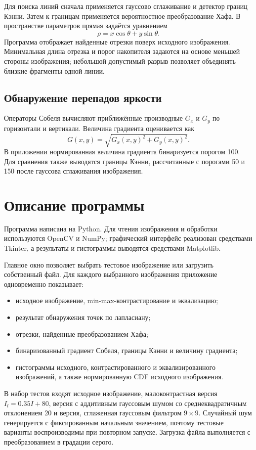 \documentclass[12pt,a4paper]{article}
\begin{document}
Для поиска линий сначала применяется гауссово сглаживание и детектор
границ Кэнни. Затем к границам применяется вероятностное преобразование
Хафа. В пространстве параметров прямая задаётся уравнением
\[
    \rho=x\cos\theta+y\sin\theta.
\]
Программа отображает найденные отрезки поверх исходного изображения.
Минимальная длина отрезка и порог накопителя задаются на основе меньшей
стороны изображения; небольшой допустимый разрыв позволяет объединять
близкие фрагменты одной линии.

\subsection{Обнаружение перепадов яркости}

Операторы Собеля вычисляют приближённые производные $G_x$ и $G_y$ по
горизонтали и вертикали. Величина градиента оценивается как
\[
    G(x,y)=\sqrt{G_x(x,y)^2+G_y(x,y)^2}.
\]
В приложении нормированная величина градиента бинаризуется порогом 100.
Для сравнения также выводятся границы Кэнни, рассчитанные с порогами 50 и
150 после гауссова сглаживания изображения.

\section{Описание программы}

Программа написана на Python. Для чтения изображения и обработки используются
OpenCV и NumPy; графический интерфейс реализован средствами Tkinter, а
результаты и гистограммы выводятся средствами Matplotlib.

Главное окно позволяет выбрать тестовое изображение или загрузить собственный
файл. Для каждого выбранного изображения приложение одновременно показывает:
\begin{itemize}
    \item исходное изображение, min-max-контрастирование и эквализацию;
    \item результат обнаружения точек по лапласиану;
    \item отрезки, найденные преобразованием Хафа;
    \item бинаризованный градиент Собеля, границы Кэнни и величину градиента;
    \item гистограммы исходного, контрастированного и эквализированного
    изображений, а также нормированную CDF исходного изображения.
\end{itemize}

В набор тестов входят исходное изображение, малоконтрастная версия
$I_l=0.35I+80$, версия с аддитивным гауссовым шумом со среднеквадратичным
отклонением 20 и версия, сглаженная гауссовым фильтром $9\times9$.
Случайный шум генерируется с фиксированным начальным значением, поэтому
тестовые варианты воспроизводимы при повторном запуске. Загрузка файла
выполняется с преобразованием в градации серого.
\end{document}
